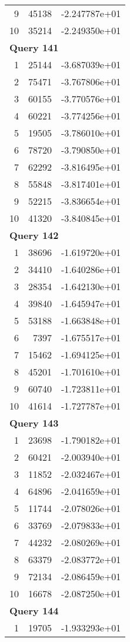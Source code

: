 \begin{longtable}[{p}]{@{}rrp{}@{}}
9 & 45138 & -2.247787e+01 \\
10 & 35214 & -2.249350e+01 \\
\midrule
\multicolumn{3}{l}{\bfseries Query 141} \\
1 & 25144 & -3.687039e+01 \\
2 & 75471 & -3.767806e+01 \\
3 & 60155 & -3.770576e+01 \\
4 & 60221 & -3.774256e+01 \\
5 & 19505 & -3.786010e+01 \\
6 & 78720 & -3.790850e+01 \\
7 & 62292 & -3.816495e+01 \\
8 & 55848 & -3.817401e+01 \\
9 & 52215 & -3.836654e+01 \\
10 & 41320 & -3.840845e+01 \\
\midrule
\multicolumn{3}{l}{\bfseries Query 142} \\
1 & 38696 & -1.619720e+01 \\
2 & 34410 & -1.640286e+01 \\
3 & 28354 & -1.642130e+01 \\
4 & 39840 & -1.645947e+01 \\
5 & 53188 & -1.663848e+01 \\
6 & 7397 & -1.675517e+01 \\
7 & 15462 & -1.694125e+01 \\
8 & 45201 & -1.701610e+01 \\
9 & 60740 & -1.723811e+01 \\
10 & 41614 & -1.727787e+01 \\
\midrule
\multicolumn{3}{l}{\bfseries Query 143} \\
1 & 23698 & -1.790182e+01 \\
2 & 60421 & -2.003940e+01 \\
3 & 11852 & -2.032467e+01 \\
4 & 64896 & -2.041659e+01 \\
5 & 11744 & -2.078026e+01 \\
6 & 33769 & -2.079833e+01 \\
7 & 44232 & -2.080269e+01 \\
8 & 63379 & -2.083772e+01 \\
9 & 72134 & -2.086459e+01 \\
10 & 16678 & -2.087250e+01 \\
\midrule
\multicolumn{3}{l}{\bfseries Query 144} \\
1 & 19705 & -1.933293e+01 \\

\end{longtable}
